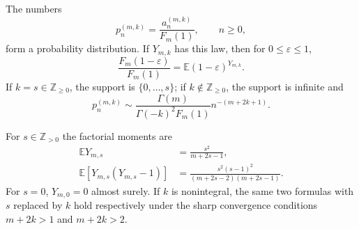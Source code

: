\begin{theorem}
\label{thm:cueM-Gauss-law}
The numbers
\begin{equation}
 p_n^{(m,k)}=\frac{a_n^{(m,k)}}{F_m(1)},\qquad n\geq0,
 \label{eq:cueM-Gauss-probabilities}
\end{equation}
form a probability distribution.  If $Y_{m,k}$ has this law, then for
$0\leq\varepsilon\leq1$,
\begin{equation}
 \frac{F_m(1-\varepsilon)}{F_m(1)}
 =\mathbb E(1-\varepsilon)^{Y_{m,k}}.
 \label{eq:cueM-Gauss-PGF}
\end{equation}
If $k=s\in\mathbb Z_{\geq0}$, the support is $\{0,\ldots,s\}$; if
$k\notin\mathbb Z_{\geq0}$, the support is infinite and
\begin{equation}
 p_n^{(m,k)}\sim
 \frac{\Gamma(m)}{\Gamma(-k)^2F_m(1)}n^{-(m+2k+1)}.
 \label{eq:cueM-Gauss-tail}
\end{equation}

For $s\in\mathbb Z_{>0}$ the factorial moments are
\begin{align}
 \mathbb EY_{m,s}&=\frac{s^2}{m+2s-1},
 \label{eq:cueM-Gauss-mean-integer}\\
 \mathbb E[Y_{m,s}(Y_{m,s}-1)]
 &=\frac{s^2(s-1)^2}{(m+2s-2)(m+2s-1)}.
 \label{eq:cueM-Gauss-second-integer}
\end{align}
For $s=0$, $Y_{m,0}=0$ almost surely.  If $k$ is nonintegral, the same two formulas with
$s$ replaced by $k$ hold respectively under the sharp convergence conditions
$m+2k>1$ and $m+2k>2$.
\end{theorem}

